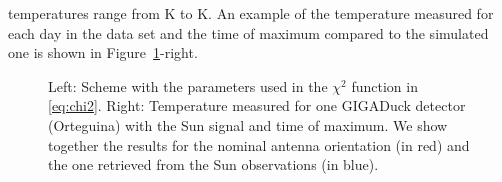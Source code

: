 temperatures range  from \unit[54]{K}  to \unit[61]{K}. An  example of
the temperature measured for each day  in the data set and the time of
maximum    compared   to    the    simulated   one    is   shown    in
Figure~\ref{fig:GDtempres}-right.
\begin{center}
\begin{table}[t]
\caption{Results   of  fits,   superscript  and   subscript   are  the
  statistical and systematics uncertainty respectively.}
\vspace{3mm}
\centering
{}
\label{tab:temptab}
\end{table}
\end{center}

\begin{figure}[!ht]
 \centering
 \hspace*{-3ex}
  \caption{Left:  Scheme with  the parameters  used in  the $\chi^{2}$
    function in \eqref{eq:chi2}.   Right: Temperature measured for one
    GIGADuck  detector (Orteguina)  with the  Sun signal  and  time of
    maximum.   We show together  the results  for the  nominal antenna
    orientation  (in   red)  and  the  one  retrieved   from  the  Sun
    observations (in blue).}
 \label{fig:GDtempres}
\end{figure}
